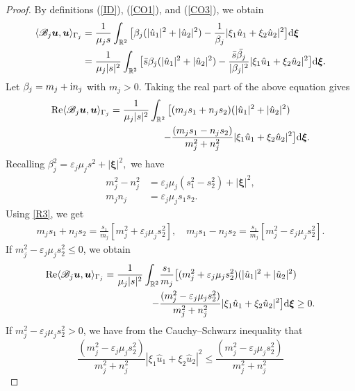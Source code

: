 \documentclass[11pt,reqno]{amsart}
\numberwithin{equation}{section}
\begin{document}
\begin{proof}
By definitions (\ref{ID}), (\ref{CO1}), and (\ref{CO3}), we obtain
\begin{align*}
\langle \mathscr B_j \boldsymbol u, \boldsymbol u \rangle_{\Gamma_j}
&=\frac{1}{ \mu_j s} \int_{\mathbb R^2} \big[ \beta_j (|\hat u_1|^2 +|\hat u_2|^2) -
\frac{1}{\beta_j}
|\xi_1 \hat u_1 +\xi_2 \hat u_2|^2 \big]{\rm d} \boldsymbol
\xi\\
&=\frac{1}{\mu_j |s|^2}\int_{\mathbb R^2} \big[ \bar s \beta_j (|\hat
u_1|^2+|\hat u_2|^2)-\frac{ \bar s \bar {\beta_j}}{|\beta_j|^2}|\xi_1 \hat u_1
+\xi_2 \hat u_2|^2 \big] {\rm d} \boldsymbol \xi.
\end{align*}
Let $\beta_j =m_j +{\rm i}  n_j$ with $m_j >0.$  Taking the real part of the
above equation gives
\begin{align*}
{\rm Re} \langle \mathscr B_j \boldsymbol u, \boldsymbol u \rangle_{\Gamma_j}  =
\frac{1}{ \mu_j |s|^2 } \int_{\mathbb R^2} \big[ &(m_j s_1 +n_j s_2) (|\hat
u_1|^2+|\hat u_2|^2)\\
-&\frac{(m_j s_1- n_j s_2) }{m_j^2+n_j^2} |\xi_1 \hat u_1
+\xi_2 \hat u_2|^2\big] {\rm d} \boldsymbol \xi.
\end{align*}
Recalling  $\beta_j^2 =\varepsilon_j \mu_j s^2+|\boldsymbol \xi|^2,$  we have
\begin{align}
m_j^2 -n_j^2&= \varepsilon_j \mu_j (s_1^2 -s_2^2)+|\boldsymbol \xi|^2, \label
{R2}\\
 m_j n_j&= \varepsilon_j \mu_j s_1 s_2. \label{R3}
\end{align}
Using \eqref {R3}, we get
\begin{align*}
m_j s_1 +n_j s_2=\frac{s_1}{m_j} [m_j^2+\varepsilon_j \mu_j s_2^2],\quad
m_j s_1 -n_j s_2= \frac{s_1}{m_j} [m_j^2 -\varepsilon_j \mu_j s_2^2].
\end{align*}
If $ m_j^2 -\varepsilon_j \mu_j s_2^2 \leq 0$, we obtain
\begin{align*}
{\rm Re} \langle \mathscr B_j \boldsymbol u, \boldsymbol u \rangle_{\Gamma_j}  =
\frac{1}{ \mu_j |s|^2 } \int_{\mathbb R^2} &\frac{s_1}{m_j}\big[
(m_j^2+\varepsilon_j \mu_j s_2^2) (|\hat u_1|^2+|\hat u_2|^2) \\
-&\frac{(m_j^2-\varepsilon_j \mu_j s_2^2)}{m_j^2+n_j^2} |\xi_1 \hat u_1 +\xi_2
\hat u_2|^2\big] {\rm d} \boldsymbol \xi \geq 0.
\end{align*}
If $ m_j^2 -\varepsilon_j \mu_j s_2^2  >0$,  we have from the
Cauchy--Schwarz inequality that 
\[
\frac{(m_j^2 -\varepsilon_j \mu_j s_2^2)}{m_j^2+n_j^2} |\xi_1 \hat u_1 +\xi_2
\hat u_2|^2   \leq  \frac{ (m_j^2 -\varepsilon_j \mu_j s_2^2)}{ m_j^2+n_j^2}
\]
\end{proof}
\end{document}
